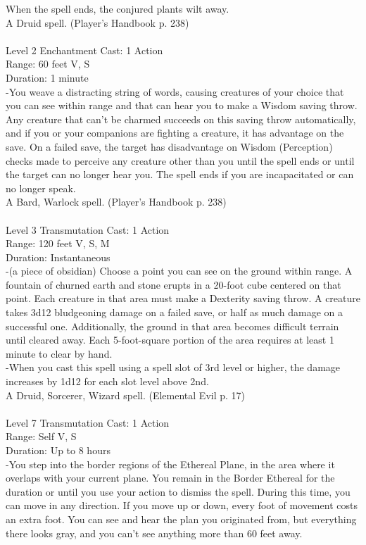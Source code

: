 \documentclass[10pt,twocolumn]{report}
\begin{document}
When the spell ends, the conjured plants wilt away.\\
A Druid spell. (Player's Handbook p. 238) \\


 \\
Level 2 \quad Enchantment \quad Cast: 1 Action\\
Range: 60 feet \quad V, S\\
Duration: 1 minute \quad \\
-You weave a distracting string of words, causing creatures of your choice that you can see within range and that can hear you to make a Wisdom saving throw. Any creature that can’t be charmed succeeds on this saving throw automatically, and if you or your companions are fighting a creature, it has advantage on the save. On a failed save, the target has disadvantage on Wisdom (Perception) checks made to perceive any creature other than you until the spell ends or until the target can no longer hear you. The spell ends if you are incapacitated or can no longer speak.\\
A Bard, Warlock spell. (Player's Handbook p. 238) \\


 \\
Level 3 \quad Transmutation \quad Cast: 1 Action\\
Range: 120 feet \quad V, S, M\\
Duration: Instantaneous \quad \\
-(a piece of obsidian)
Choose a point you can see on the ground within range. A fountain of churned earth and stone erupts in a 20-foot cube centered on that point. Each creature
in that area must make a Dexterity saving throw. A creature takes 3d12 bludgeoning damage on a failed save, or half as much damage on a successful one. Additionally, the ground in that area becomes difficult terrain until cleared away. Each 5-foot-square portion of the area requires at least 1 minute to clear by hand.\\
-When you cast this spell using a spell slot of 3rd level or higher, the damage increases by 1d12 for each slot level above 2nd.\\
A Druid, Sorcerer, Wizard spell. (Elemental Evil p. 17) \\


 \\
Level 7 \quad Transmutation \quad Cast: 1 Action\\
Range: Self \quad V, S\\
Duration: Up to 8 hours \quad \\
-You step into the border regions of the Ethereal Plane, in the area where it overlaps with your current plane. You remain in the Border Ethereal for the duration or until you use your action to dismiss the spell. During this time, you can move in any direction. If you move up or down, every foot of movement costs an extra foot. You can see and hear the plan you originated from, but everything there looks gray, and you can’t see anything more than 60 feet away. 
\end{document}
